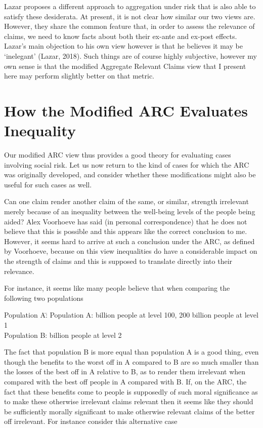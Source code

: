 \documentclass[man,11pt,a4paper]{apa7}
\begin{document}
Lazar proposes a different approach to aggregation under risk that is also able to satisfy these desiderata. At present, it is not clear how similar our two views are. However, they share the common feature that, in order to assess the relevance of claims, we need to know facts about both their ex-ante and ex-post effects. Lazar's main objection to his own view however is that he believes it may be `inelegant' (Lazar, 2018). Such things are of course highly subjective, however my own sense is that the modified Aggregate Relevant Claims view that I present here may perform slightly better on that metric.

\section{How the Modified ARC Evaluates Inequality}

Our modified ARC view thus provides a good theory for evaluating cases involving social risk. Let us now return to the kind of cases for which the ARC was originally developed, and consider whether these modifications might also be useful for such cases as well.

Can one claim render another claim of the same, or similar, strength irrelevant merely because of an inequality between the well-being levels of the people being aided? Alex Voorhoeve has said (in personal correspondence) that he does not believe that this is possible and this appears like the correct conclusion to me. However, it seems hard to arrive at such a conclusion under the ARC, as defined by Voorhoeve, because on this view inequalities do have a considerable impact on the strength of claims and this is supposed to translate directly into their relevance.

For instance, it seems like many people believe that when comparing the following two populations

\begin{tabbing}
Population A:\quad\= \kill
Population A:  billion people at level 100, 200 billion people at level 1 \\
Population B:  billion people at level 2
\end{tabbing}

\noindent The fact that population B is more equal than population A is a good thing, even though the benefits to the worst off in A compared to B are so much smaller than the losses of the best off in A relative to B, as to render them irrelevant when compared with the best off people in A compared with B. If, on the ARC, the fact that these benefits come to people is supposedly of such moral significance as to make these otherwise irrelevant claims relevant then it seems like they should be sufficiently morally significant to make otherwise relevant claims of the better off irrelevant. For instance consider this alternative case
\end{document}
